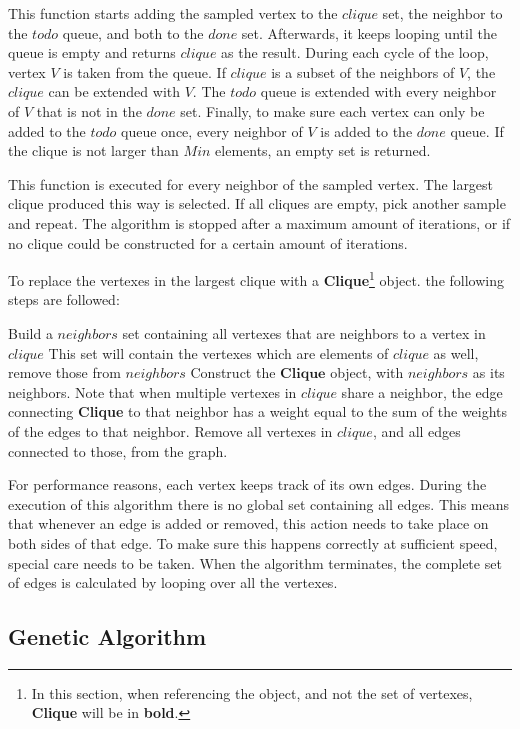 This function starts adding the sampled vertex to the $clique$ set, the neighbor to the $todo$ queue, and both to the $done$ set. Afterwards, it keeps looping until the queue is empty and returns $clique$ as the result. During each cycle of the loop, vertex $V$ is taken from the queue. If $clique$ is a subset of the neighbors of $V$, the $clique$ can be extended with $V$. The $todo$ queue is extended with every neighbor of $V$ that is not in the $done$ set. Finally, to make sure each vertex can only be added to the $todo$ queue once, every neighbor of $V$ is added to the $done$ queue. If the clique is not larger than $Min$ elements, an empty set is returned.
\par
This function is executed for every neighbor of the sampled vertex. The largest clique produced this way is selected. If all cliques are empty, pick another sample and repeat. The algorithm is stopped after a maximum amount of iterations, or if no clique could be constructed for a certain amount of iterations.
\par
 To replace the vertexes in the largest clique with a \textbf{Clique}\footnote{In this section, when referencing the object, and not the set of vertexes, \textbf{Clique} will be in \textbf{bold}.} object. the following steps are followed:
\begin{algorithmic}[1]
\STATE Build a $neighbors$ set containing all vertexes that are neighbors to a vertex in $clique$
\STATE This set will contain the vertexes which are elements of $clique$ as well, remove those from $neighbors$
\STATE Construct the $\textbf{Clique}$ object, with $neighbors$ as its neighbors. Note that when multiple vertexes in $clique$ share a neighbor, the edge connecting \textbf{Clique} to that neighbor has a weight equal to the sum of the weights of the edges to that neighbor.
\STATE Remove all vertexes in $clique$, and all edges connected to those, from the graph.
\end{algorithmic}
\par
For performance reasons, each vertex keeps track of its own edges. During the execution of this algorithm there is no global set containing all edges. This means that whenever an edge is added or removed, this action needs to take place on both sides of that edge. To make sure this happens correctly at sufficient speed, special care needs to be taken. When the algorithm terminates, the complete set of edges is calculated by looping over all the vertexes.
\subsection{Genetic Algorithm}
